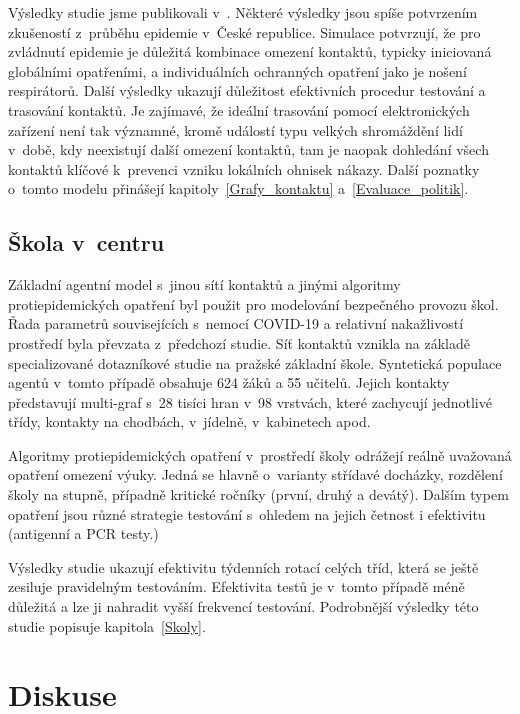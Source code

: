 Výsledky studie jsme publikovali v~\cite{M-techrep2021}. Některé výsledky jsou spíše potvrzením zkušeností z~průběhu epidemie v~České republice. Simulace potvrzují, že pro zvládnutí epidemie je důležitá kombinace omezení kontaktů, typicky iniciovaná globálními opatřeními, a individuálních ochranných opatření jako je nošení respirátorů. Další výsledky ukazují důležitost efektivních procedur testování a trasování kontaktů. Je zajímavé, že ideální trasování pomocí elektronických zařízení není tak významné, kromě událostí typu velkých shromáždění lidí v~době, kdy neexistují další omezení kontaktů, tam je naopak dohledání všech kontaktů klíčové k~prevenci vzniku lokálních ohnisek nákazy. Další poznatky o~tomto modelu přinášejí kapitoly~\ref{Grafy_kontaktu}
a~\ref{Evaluace_politik}.


\subsection*{Škola v~centru}

Základní agentní model s~jinou sítí kontaktů a jinými algoritmy protiepidemických opatření byl použit pro modelování bezpečného provozu škol. Řada parametrů souvisejících s~nemocí COVID-19 a relativní nakažlivostí prostředí byla převzata z~před\-cho\-zí studie. Síť kontaktů vznikla na základě specializované dotazníkové studie na pražské základní škole. Syntetická populace agentů v~tomto případě obsahuje 624 žáků a 55 učitelů. Jejich kontakty představují multi-graf s~28 tisíci hran v~98 vrstvách, které zachycují jednotlivé třídy, kontakty na chodbách, v~jídelně, v~kabinetech apod. 

Algoritmy protiepidemických opatření v~prostředí školy odrážejí reálně uvažovaná opatření omezení výuky. Jedná se hlavně o~varianty střídavé docházky, rozdělení školy na stupně, případně kritické ročníky (první, druhý a devátý). Dalším typem opatření jsou různé strategie testování s~ohledem na jejich četnost i efektivitu (antigenní a PCR testy.)

Výsledky studie ukazují efektivitu týdenních rotací celých tříd, která se ještě zesiluje pravidelným testováním. Efektivita testů je v~tomto případě méně důležitá a lze ji nahradit vyšší frekvencí testování. Podrobnější výsledky této studie popisuje kapitola~\ref{Skoly}.







\section*{Diskuse} 

